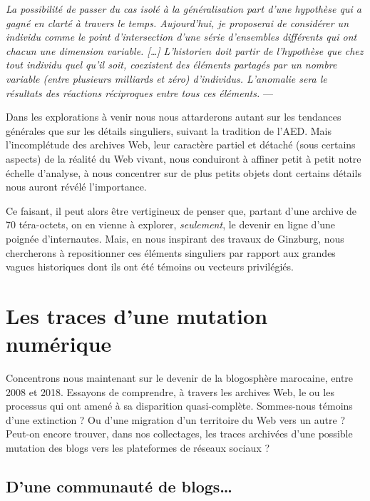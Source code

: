 \documentclass[symmetric,justified,marginals=raggedouter]{tufte-book}
\begin{document}
\begin{fullwidth}
\og\textit{La possibilité de passer du cas isolé à la généralisation part d'une hypothèse qui a gagné en clarté à travers le temps. Aujourd'hui, je proposerai de considérer un individu comme le point d'intersection d'une série d'ensembles différents qui ont chacun une dimension variable. [\ldots{}] L'historien doit partir de l'hypothèse que chez tout individu quel qu'il soit, coexistent des éléments partagés par un nombre variable (entre plusieurs milliards et zéro) d'individus. L'anomalie sera le résultats des réactions réciproques entre tous ces éléments.}\fg{} --- \citep[p.359-360]{ginzburg_mythes_2012}\\
\end{fullwidth} 

\noindent Dans les explorations à venir nous nous attarderons autant sur les tendances générales que sur les détails singuliers, suivant la tradition de l'AED. Mais l'incomplétude des archives Web, leur caractère partiel et détaché (sous certains aspects) de la réalité du Web vivant, nous conduiront à affiner petit à petit notre échelle d'analyse, à nous concentrer sur de plus petits objets dont certains détails nous auront révélé l'importance. 

Ce faisant, il peut alors être vertigineux de penser que, partant d'une archive de 70 téra-octets, on en vienne à explorer, \textit{seulement}, le devenir en ligne d'une poignée d'internautes. Mais, en nous inspirant des travaux de Ginzburg, nous chercherons à repositionner ces éléments singuliers par rapport aux grandes vagues historiques dont ils ont été témoins ou vecteurs privilégiés. 

\section{Les traces d'une mutation numérique}
\label{sec:6_blogs}

\noindent Concentrons nous maintenant sur le devenir de la blogosphère marocaine, entre 2008 et 2018. Essayons de comprendre, à travers les archives Web, le ou les processus qui ont amené à sa disparition quasi-complète. Sommes-nous témoins d'une extinction ? Ou d'une migration d'un territoire du Web vers un autre ? Peut-on encore trouver, dans nos collectages, les traces archivées d'une possible mutation des blogs vers les plateformes de réseaux sociaux ? 

\subsection{D'une communauté de blogs\ldots{}}
\end{document}
